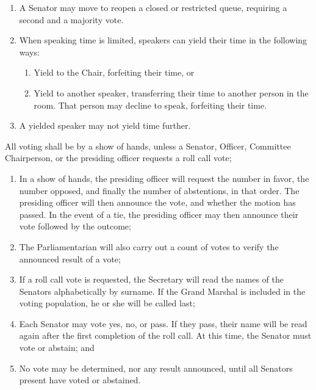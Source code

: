 \begin{enumerate}
{\begin{enumerate}
    \item A Senator may move to reopen a closed or restricted queue, requiring a second and a majority vote.

   \item When speaking time is limited, speakers can yield their time in the following ways:
    \begin{enumerate}
        \item Yield to the Chair, forfeiting their time, or
        \item Yield to another speaker, transferring their time to another person in the room. That person may decline to speak, forfeiting their time.
    \end{enumerate}

    \item A yielded speaker may not yield time further.
\end{enumerate} }

{\bf \item All voting shall be by a show of hands, unless a Senator, Officer, Committee Chairperson, or the presiding officer requests a roll call vote;
\begin{enumerate}
    \item In a show of hands, the presiding officer will request the number in favor, the number opposed, and finally the number of abstentions, in that order. The presiding officer will then announce the vote, and whether the motion has passed. In the event of a tie, the presiding officer may then announce their vote followed by the outcome;
    \item The Parliamentarian will also carry out a count of votes to verify the announced result of a vote;
    \item If a roll call vote is requested, the Secretary will read the names of the Senators alphabetically by surname. If the Grand Marshal is included in the voting population, he or she will be called last;
    \item Each Senator may vote yes, no, or pass. If they pass, their name will be read again after the first completion of the roll call. At this time, the Senator must vote or abstain; and
    \item No vote may be determined, nor any result announced, until all Senators present have voted or abstained.
\end{enumerate} }

\end{enumerate}
